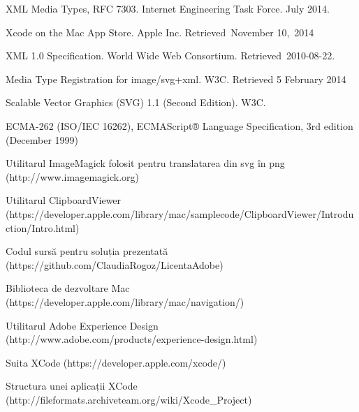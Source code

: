 \begin{thebibliography}{9}
XML Media Types, RFC 7303. Internet Engineering Task Force. July 2014.
 
Xcode on the Mac App Store. Apple Inc. Retrieved November 10, 2014
 
XML 1.0 Specification. World Wide Web Consortium. Retrieved 2010-08-22.

Media Type Registration for image/svg+xml. W3C. Retrieved 5 February 2014 

Scalable Vector Graphics (SVG) 1.1 (Second Edition). W3C.

ECMA-262 (ISO/IEC 16262), ECMAScript® Language Specification, 3rd edition (December 1999)

Utilitarul ImageMagick folosit pentru translatarea din svg în png (http://www.imagemagick.org)

Utilitarul ClipboardViewer (https://developer.apple.com/library/mac/samplecode/ClipboardViewer/Introduction/Intro.html)

Codul sursă pentru soluția prezentată (https://github.com/ClaudiaRogoz/LicentaAdobe)

Biblioteca de dezvoltare Mac (https://developer.apple.com/library/mac/navigation/)

Utilitarul Adobe Experience Design (http://www.adobe.com/products/experience-design.html)

Suita XCode (https://developer.apple.com/xcode/)

Structura unei aplicații XCode (http://fileformats.archiveteam.org/wiki/Xcode_Project)

\end{thebibliography}

